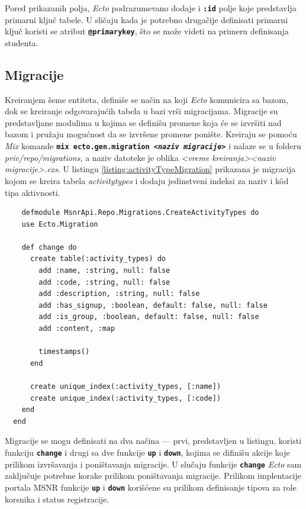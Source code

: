 \documentclass[12pt,oneside]{memoir}
\begin{document}
Pored prikazanih polja, \emph{Ecto} podrazumevano dodaje i \texttt{\textbf{:id}} polje
koje predstavlja primarni ključ tabele. U sličaju kada je potrebno drugačije definisati primarni ključ koristi
se atribut \texttt{\textbf{@primary{\textunderscore}key}}, što se može videti na primeru definisanja studenta.

\subsection{Migracije}
Kreiranjem šeme entiteta, definiše se način na koji \emph{Ecto} komunicira sa bazom, dok se kreiranje odgovarajućih
tabela u bazi vrši migracijama. Migracije su predstavljane modulima u kojima se definišu promene koja će se izvršiti nad
bazom i pružaju mogućnost da se izvršene promene ponište. Kreiraju se pomoću \emph{Mix} komande 
\texttt{\textbf{mix ecto.gen.migration \emph{<naziv migracije>}}} i nalaze se u folderu
\emph{priv/repo/migrations}, a naziv datoteke je oblika \emph{<vreme kreiranja>{\textunderscore}<naziv migracije>.exs}.
U listingu \ref{listing:activityTypeMigration} prikazana je migracija kojom se kreira tabela \emph{activity{\textunderscore}types} i
dodaju jedinstveni indeksi za naziv i k\^{o}d tipa aktivnosti.
\begin{listing}[!h]
  \begin{verbatim}
    defmodule MsnrApi.Repo.Migrations.CreateActivityTypes do
    use Ecto.Migration
  
    def change do
      create table(:activity_types) do
        add :name, :string, null: false
        add :code, :string, null: false
        add :description, :string, null: false
        add :has_signup, :boolean, default: false, null: false
        add :is_group, :boolean, default: false, null: false
        add :content, :map
  
        timestamps()
      end
  
      create unique_index(:activity_types, [:name])
      create unique_index(:activity_types, [:code])
    end
  end
\end{verbatim}
\caption{Migracija za kreiranje tabele \emph{activity{\textunderscore}types}}
\label{listing:activityTypeMigration}
\end{listing}

Migracije se mogu definisati na dva načina --- prvi, predstavljen u listingu, koristi funkciju \texttt{\textbf{change}}
i drugi sa dve funkcije \texttt{\textbf{up}} i \texttt{\textbf{down}}, kojima se difinišu akcije koje prilikom izvršavanja i
poništavanja migracije. U slučaju funkcije \texttt{\textbf{change}} \emph{Ecto} sam zaključuje potrebne korake prilikom
poništavanja migracije. Prilikom implentacije portala MSNR funkcije \texttt{\textbf{up}} i \texttt{\textbf{down}} korišćene
su prilikom definisanje tipova za role korsnika i status registracije. 
\end{document}
